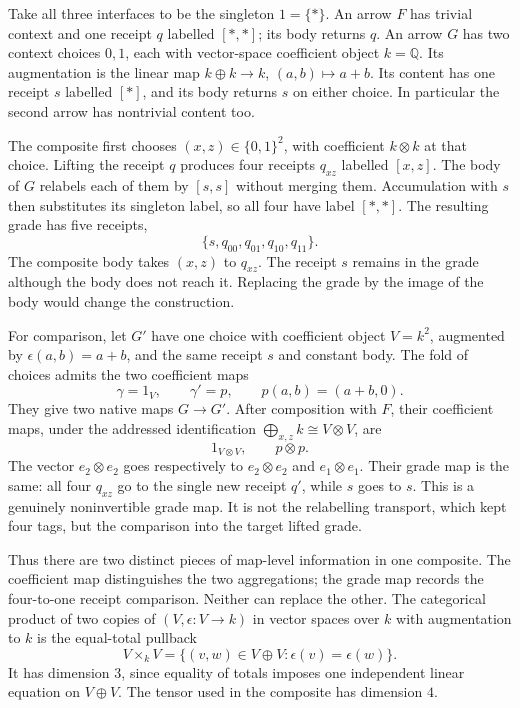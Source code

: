 \documentclass[11pt]{article}
\numberwithin{equation}{section}
\theoremstyle{definition}\newtheorem{definition}[theorem]{Definition}
\begin{document}
Take all three interfaces to be the singleton $1=\{*\}$. An arrow $F$
has trivial context and one receipt $q$ labelled $[*,*]$; its body returns
$q$. An arrow $G$ has two context choices $0,1$, each with vector-space
coefficient object $k=\mathbb Q$. Its augmentation is the linear map
$k\oplus k\to k$, $(a,b)\mapsto a+b$. Its content has one
receipt $s$ labelled $[*]$, and its body returns $s$ on either choice.
In particular the second arrow has nontrivial content too.

The composite first chooses $(x,z)\in\{0,1\}^2$, with coefficient
$k\otimes k$ at that choice. Lifting the receipt $q$ produces four
receipts $q_{xz}$ labelled $[x,z]$. The body of $G$ relabels each of them
by $[s,s]$ without merging them. Accumulation with $s$ then substitutes
its singleton label, so all four have label $[*,*]$. The resulting grade
has five receipts,
\[
                 \{s,q_{00},q_{01},q_{10},q_{11}\}.
\]
The composite body takes $(x,z)$ to $q_{xz}$. The receipt $s$ remains in
the grade although the body does not reach it. Replacing the grade by the
image of the body would change the construction.

For comparison, let $G'$ have one choice with coefficient object $V=k^2$,
augmented
by $\epsilon(a,b)=a+b$, and the same receipt $s$ and constant body. The
fold of choices admits the two coefficient maps
\begin{equation}\label{eq:rankmaps}
 \gamma=1_V,\qquad \gamma'=p,\qquad p(a,b)=(a+b,0).
\end{equation}
They give two native maps $G\to G'$. After composition with $F$, their
coefficient maps, under the addressed identification
$\bigoplus_{x,z}k\cong V\otimes V$, are
\[
                 1_{V\otimes V},\qquad p\otimes p.
\]
The vector $e_2\otimes e_2$ goes respectively to $e_2\otimes e_2$ and
$e_1\otimes e_1$. Their grade map is the same: all four $q_{xz}$ go to
the single new receipt $q'$, while $s$ goes to $s$. This is a genuinely
noninvertible grade map. It is not the relabelling transport, which kept
four tags, but the comparison into the target lifted grade.

Thus there are two distinct pieces of map-level information in one
composite. The coefficient map distinguishes the two aggregations; the
grade map records the four-to-one receipt comparison. Neither can replace
the other. The categorical product of two copies of $(V,\epsilon:V\to k)$ in vector
spaces over $k$ with augmentation to $k$ is the equal-total pullback
\[
 V\times_kV=\{(v,w)\in V\oplus V:\epsilon(v)=\epsilon(w)\}.
\]
It has dimension $3$, since equality of totals imposes one independent
linear equation on $V\oplus V$. The tensor used in the composite has
dimension $4$.
\end{document}
